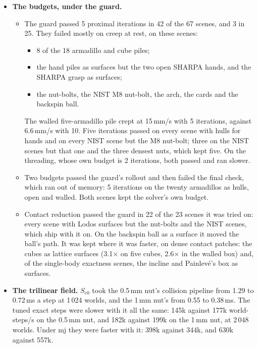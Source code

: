 \begin{itemize}
\begin{itemize}
  \item 16--32 for the bodies against the planes in three scenes (the walled five-armadillo and five-cube piles, the backspin ball), 7--9\,\% off.
  \end{itemize}
  The default of 8 held for the five-armadillo drop it was chosen on, the nut-bolts and the grasps.
\item \textbf{The budgets, under the guard.}
  \begin{itemize}
  \item The guard passed 5 proximal iterations in 42 of the 67 scenes, and 3 in 25. They failed mostly on creep at rest, on these scenes:
    \begin{itemize}
    \item 8 of the 18 armadillo and cube piles;
    \item the hand piles as surfaces but the two open SHARPA hands, and the SHARPA grasp as surfaces;
    \item the nut-bolts, the NIST M8 nut-bolt, the arch, the cards and the backspin ball.
    \end{itemize}
    The walled five-armadillo pile crept at 15\,mm/s with 5 iterations, against 6.6\,mm/s with 10. Five iterations passed on every scene with hulls for hands and on every NIST scene but the M8 nut-bolt; three on the NIST scenes but that one and the three densest nuts, which kept five. On the threading, whose own budget is 2 iterations, both passed and ran slower.
  \item Two budgets passed the guard's rollout and then failed the final check, which ran out of memory: 5 iterations on the twenty armadillos as hulls, open and walled. Both scenes kept the solver's own budget.
  \item Contact reduction passed the guard in 22 of the 23 scenes it was tried on: every scene with Lodos surfaces but the nut-bolts and the NIST scenes, which ship with it on. On the backspin ball as a surface it moved the ball's path. It was kept where it was faster, on dense contact patches: the cubes as lattice surfaces (3.1$\times$ on five cubes, 2.6$\times$ in the walled box) and, of the single-body exactness scenes, the incline and Painlev\'e's box as surfaces.
  \end{itemize}
\item \textbf{The trilinear field.} $S_{\mathrm{c0}}$ took the 0.5\,mm nut's collision pipeline from 1.29 to 0.72\,ms a step at 1\,024 worlds, and the 1\,mm nut's from 0.55 to 0.38\,ms. The tuned exact steps were slower with it all the same: 145k against 177k world-steps/s on the 0.5\,mm nut, and 182k against 199k on the 1\,mm nut, at 2\,048 worlds. Under mj they were faster with it: 398k against 344k, and 630k against 557k.

\end{itemize}
